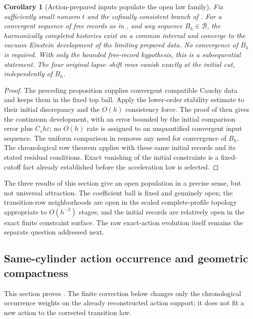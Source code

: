 \documentclass[11pt]{article}
\numberwithin{equation}{section}
\newtheorem{corollary}[corollary]{Corollary}
\theoremstyle{definition}
\theoremstyle{remark}
\begin{document}
\begin{corollary}[Action-prepared inputs populate the open law family]
\label{cor:supp-action-prepared-einstein}
Fix sufficiently small nonzero $t$ and the cofinally consistent branch of
.  For a convergent sequence of free
records as in , and any sequence
$B_h\in\overline{\mathcal B}$, the harmonically completed histories exist
on a common interval and converge to the vacuum Einstein development of
the limiting prepared data.  No convergence of $B_h$ is required.  With
only the bounded free-record hypothesis, this is a subsequential statement.
The four original lapse--shift rows vanish exactly at the initial cut,
independently of $B_h$.
\end{corollary}
\begin{proof}
The preceding proposition supplies convergent compatible Cauchy data and
keeps them in the fixed top ball.  Apply the lower-order stability estimate
to their initial discrepancy and the $O(h)$ consistency force.  The proof
of  then gives the continuum development, with
an error bounded by the initial comparison error plus $C_sh\varepsilon$;
no $O(h)$ rate is assigned to an unquantified convergent input sequence.
The uniform comparison in  removes any need for
convergence of $B_h$.  The chronological row theorem applies with these same
initial records and its stated residual conditions.  Exact vanishing of
the initial constraints is a fixed-cutoff fact already established before
the acceleration law is selected.
\end{proof}

The three results of this section give an open population in a precise sense,
but not universal attraction.  The coefficient ball is fixed and genuinely
open; the transition-row neighborhoods are open in the scaled complete-profile
topology appropriate to $O(h^{-2})$ stages; and the initial records are
relatively open in the exact finite constraint surface.  The raw exact-action
evolution itself remains the separate question addressed next.


\subsection{Same-cylinder action occurrence and geometric compactness}
\label{supp:same-cylinder}

This section proves .  The finite
correction below changes only the chronological occurrence weights on the
already reconstructed action support; it does not fit a new action to the
corrected transition law.
\end{document}
